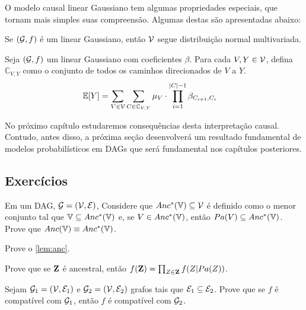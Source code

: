 O modelo causal linear Gaussiano tem
algumas propriedades especiais, que
tornam mais simples suas compreensão.
Algumas destas são apresentadas abaixo:

\begin{lemma}
 \label{lemma:cm_linear_normal}
 Se $({\mathcal G},f)$ é um \CM linear Gaussiano, então
 ${\mathcal V}$ segue distribuição normal multivariada.
\end{lemma}

\begin{lemma}
 \label{lemma:cm_linear_esp}
 Seja $({\mathcal G},f)$ um \CM linear Gaussiano com coeficientes $\beta$.
 Para cada $V, Y \in {\mathcal V}$, defina $\mathbb{C}_{V,Y}$ como 
 o conjunto de todos os caminhos direcionados de $V$ a $Y$.
 \begin{align*}
  {\mathbb E}[Y] &= \sum_{V \in \mathbb{{\mathcal V}}} 
  \sum_{C \in \mathbb{C}_{V,Y}}
  \mu_V \cdot \prod_{i=1}^{|C|-1} \beta_{C_{i+1},C_i}
 \end{align*}
\end{lemma}

No próximo capítulo estudaremos consequências desta interpretação causal.
Contudo, antes disso, a próxima seção desenvolverá
um resultado fundamental de modelos probabilísticos em DAGs que
será fundamental nos capítulos posteriores.

\subsection{Exercícios}

\begin{exercise}
 Em um DAG, ${\mathcal G} = ({\mathcal V}, {\mathcal E})$,
 Considere que $Anc^*({\mathbb V}) \subseteq {\mathcal V}$ é
 definido como o menor conjunto tal que
 ${\mathbb V} \subseteq Anc^*({\mathbb V})$ e,
 se $V \in Anc^*({\mathbb V})$, então
 $Pa(V) \subseteq Anc^*({\mathbb V})$.
 Prove que $Anc({\mathbb V}) \equiv Anc^*({\mathbb V})$.
\end{exercise}

\begin{exercise} 
 Prove o \cref{lem:anc}.
\end{exercise}

\begin{exercise}
 \label{lemma:anc_fact}
 Prove que se ${\mathbf{Z}}$ é ancestral, então
 $f({\mathbf{Z}}) = \prod_{Z \in {\mathbf{Z}}}f(Z|Pa(Z))$. 
\end{exercise}

\begin{exercise}
 Sejam ${\mathcal G}_1 = ({\mathcal V}, {\mathcal E}_1)$ e
 ${\mathcal G}_2 = ({\mathcal V}, {\mathcal E}_2)$ grafos
 tais que ${\mathcal E}_1 \subseteq {\mathcal E}_2$.
 Prove que se 
 $f$ é compatível com ${\mathcal G}_1$, então 
 $f$ é compatível com ${\mathcal G}_2$.
\end{exercise}

